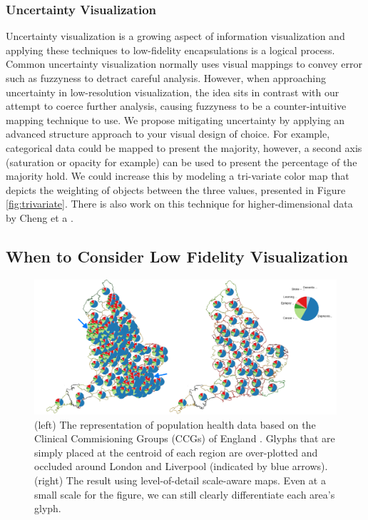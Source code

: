 \subsubsection*{Uncertainty Visualization}
Uncertainty visualization is a growing aspect of information visualization and applying these techniques to low-fidelity encapsulations is a logical process. Common uncertainty visualization normally uses visual mappings to convey error such as fuzzyness to detract careful analysis. However, when approaching uncertainty in low-resolution visualization, the idea sits in contrast with our attempt to coerce further analysis, causing fuzzyness to be a counter-intuitive mapping technique to use. We propose mitigating uncertainty by applying an advanced structure approach to your visual design of choice.
For example, categorical data could be mapped to present the majority, however, a second axis (saturation or opacity for example) can be used to present the percentage of the majority hold.
We could increase this by modeling a tri-variate color map that depicts the weighting of objects between the three values, presented in Figure \ref{fig:trivariate}. 
There is also work on this technique for higher-dimensional data by Cheng et a \cite{cheng2019colormap}.  

\subsection{When to Consider Low Fidelity Visualization}
\begin{figure}[t]
\includegraphics[width=1\textwidth]{images/ch5/ccgsetPie2}
\caption{(left) The representation of population health data based on the Clinical Commisioning Groups (CCGs) of England \cite{publicHealthEngland}. Glyphs that are simply placed at the centroid of each region are over-plotted and occluded around London and Liverpool (indicated by blue arrows). (right) The result using level-of-detail scale-aware maps. Even at a small scale for the figure, we can still clearly differentiate each area's glyph.} \label{fig:occlusion}
\end{figure}

